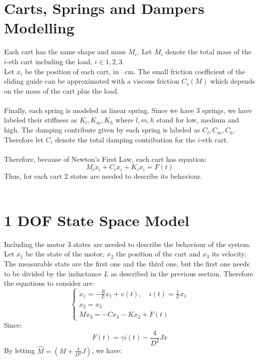 \section{Carts, Springs and Dampers Modelling}
Each cart has the same shape and mass $M_{c}$. Let $M_{i}$ denote the total mass of the $i$-eth cart including the load, $i \in {1,2,3}$. \\
Let $x_{i}$ be the position of each cart, in \SI{}{\cm}. The small friction coefficient of the sliding guide can be approximated with a viscous friction $C_{s}(M)$ which depends on the mass of the cart plus the load. \\ \\
Finally, each spring is modeled as linear spring. Since we have 3 springs, we have labeled their stiffness as $K_l, K_m, K_h$ where $l,m,h$ stand for low, medium and high. The damping contribute given by each spring is labeled as $C_l, C_m, C_h$. Therefore let $C_{i}$ denote the total damping contribution for the $i$-eth cart.\\ \\
Therefore, because of Newton's First Law, each cart has equation:
$$M_i \ddot{x}_i + C_{i} \dot{x}_i + K_{i}x_{i}=F(t)$$
Thus, for each cart 2 states are needed to describe its behaviour.\\ \\
\section{1 DOF State Space Model}
Including the motor 3 states are needed to describe the behaviour of the system. Let $x_{1}$ be the state of the motor, $x_{2}$ the position of the cart and $x_{3}$ its velocity. The measurable state are the first one and the third one, but the first one needs to be divided by the inductance $L$ as described in the previous section. Therefore the equations to consider are:
\begin{equation}
\begin{cases}
\dot{x}_1 = -\frac{R}{L}x_{1}+v(t), \quad i(t) = \frac{1}{L}x_1 \\
\dot{x}_2 = x_3 \\
M\dot{x}_3 = -Cx_3 -K x_2 + F(t)
\end{cases}
\end{equation}
Since:
$$F(t)=\gamma i(t) - \frac{4}{D^2}J \ddot{x}$$
By letting $\hat{M} = (M+\frac{4}{D^2}J)$, we have:

